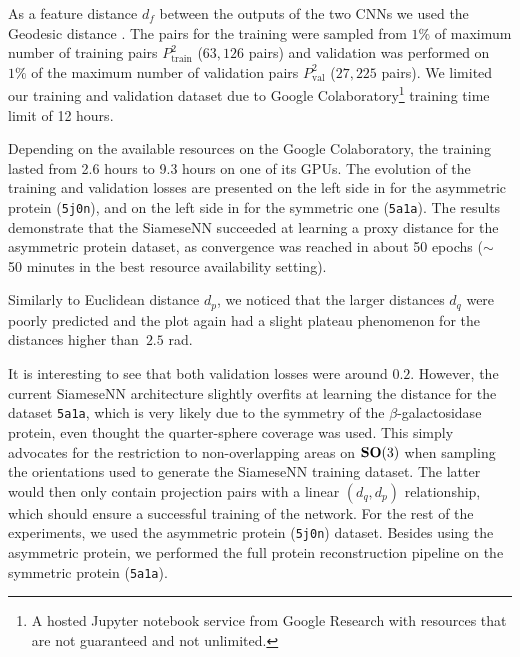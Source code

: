 As a feature distance $d_f$ between the outputs of the two CNNs we used the Geodesic distance .
The pairs for the training were sampled from $1\%$ of maximum number of training pairs $P_{\text{train}}^2$ ($63,126$ pairs) and validation was performed on $1\%$ of the maximum number of validation pairs $P_{\text{val}}^2$ ($27,225$ pairs).
We limited our training and validation dataset due to Google Colaboratory\footnote{A hosted Jupyter notebook service from Google Research with resources that are not guaranteed and not unlimited.} training time limit of 12 hours.

Depending on the available resources on the Google Colaboratory, the training lasted from 2.6 hours to 9.3 hours on one of its GPUs.
The evolution of the training and validation losses are presented on the left side in  for the asymmetric protein (\texttt{5j0n}), and on the left side in  for the symmetric one (\texttt{5a1a}).
The results demonstrate that the SiameseNN succeeded at learning a proxy distance for the asymmetric protein dataset, as convergence was reached in about 50 epochs ($\sim$ 50 minutes in the best resource availability setting).

Similarly to Euclidean distance $d_p$, we noticed that the larger distances $d_q$ were poorly predicted and the plot again had a slight plateau phenomenon for the distances higher than~$2.5$ rad.

It is interesting to see that both validation losses were around $0.2$.
However, the current SiameseNN architecture slightly overfits at learning the distance for the dataset \texttt{5a1a}, which is very likely due to the symmetry of the $\beta$-galactosidase protein, even thought the quarter-sphere coverage was used.
This simply advocates for the restriction to non-overlapping areas on $\mathrm{\mathbf{SO}}(3)$ when sampling the orientations used to generate the SiameseNN training dataset.
The latter would then only contain projection pairs with a linear $(d_q,d_p)$ relationship, which should ensure a successful training of the network.
For the rest of the experiments, we used the asymmetric protein (\texttt{5j0n}) dataset.
Besides using the asymmetric protein, we performed the full protein reconstruction pipeline on the symmetric protein (\texttt{5a1a}).

